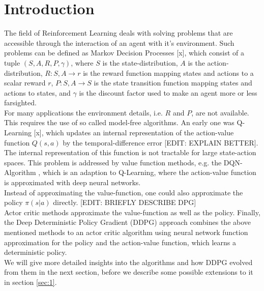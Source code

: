 \section{Introduction}
\label{sec:intro}
The field of Reinforcement Learning deals with solving problems that are accessible through the interaction of an agent with it's environment. Such problems can be defined as Markov Decision Processes [x], which consist of a tuple $(S, A, R, P, \gamma)$, where $S$ is the state-distribution, $A$ is the action-distribution, $R:S,A\rightarrow r$ is the reward function mapping states and actions to a scalar reward $r$, $P:S,A\rightarrow S$ is the state transition function mapping states and actions to states, and $\gamma$ is the discount factor used to make an agent more or less farsighted.\\
For many applications the environment details, i.e. $R$ and $P$, are not available. This requires the use of so called model-free algorithms. An early one was Q-Learning [x], which updates an internal representation of the action-value function $Q(s,a)$ by the temporal-difference error [EDIT: EXPLAIN BETTER].\\
The internal representation of this function is not tractable for large state-action spaces. This problem is addressed by value function methods, e.g. the DQN-Algorithm \citep{mnih2013playing}, which is an adaption to Q-Learning, where the action-value function is approximated with deep neural networks.\\
Instead of approximating the value-function, one could also approximate the policy $\pi(s|a)$ directly. 
[EDIT: BRIEFLY DESCRIBE DPG]\\
Actor critic methods \citep{konda2000actor} approximate the value-function as well as the policy.
Finally, the Deep Deterministic Policy Gradient (DDPG) approach \citep{lillicrap2015continuous} combines the above mentioned methods to an actor critic algorithm using neural network function approximation for the policy and the action-value function, which learns a deterministic policy.\\
We will give more detailed insights into the algorithms and how DDPG evolved from them in the next section, before we describe some possible extensions to it in section \ref{sec:1}.

